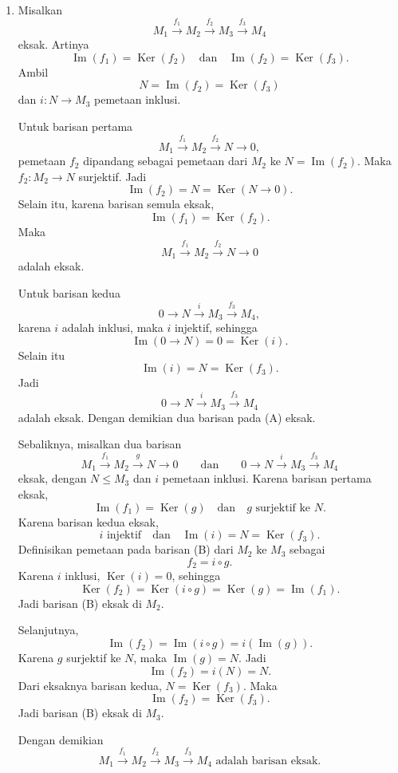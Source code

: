 \documentclass[11pt,letterpaper]{article}
\newcommand{\Ker}{\operatorname{Ker}}
\newcommand{\Img}{\operatorname{Im}}
\begin{document}
\begin{enumerate}
        Dengan demikian
        \[
          \boxed{M=M_t \oplus N}
        \]
        dengan $N$ submodul bebas dari $M$.

  \item Misalkan
        \[
          M_1 \xrightarrow{f_1} M_2 \xrightarrow{f_2} M_3 \xrightarrow{f_3} M_4
        \]
        eksak. Artinya
        \[
          \Img(f_1)=\Ker(f_2)
          \quad \text{dan} \quad
          \Img(f_2)=\Ker(f_3).
        \]
        Ambil
        \[
          N=\Img(f_2)=\Ker(f_3)
        \]
        dan $i:N \to M_3$ pemetaan inklusi.

        Untuk barisan pertama
        \[
          M_1 \xrightarrow{f_1} M_2 \xrightarrow{f_2} N \to 0,
        \]
        pemetaan $f_2$ dipandang sebagai pemetaan dari $M_2$ ke $N=\Img(f_2)$. Maka $f_2:M_2 \to N$ surjektif. Jadi
        \[
          \Img(f_2)=N=\Ker(N \to 0).
        \]
        Selain itu, karena barisan semula eksak,
        \[
          \Img(f_1)=\Ker(f_2).
        \]
        Maka
        \[
          M_1 \xrightarrow{f_1} M_2 \xrightarrow{f_2} N \to 0
        \]
        adalah eksak.

        Untuk barisan kedua
        \[
          0 \to N \xrightarrow{i} M_3 \xrightarrow{f_3} M_4,
        \]
        karena $i$ adalah inklusi, maka $i$ injektif, sehingga
        \[
          \Img(0 \to N)=0=\Ker(i).
        \]
        Selain itu
        \[
          \Img(i)=N=\Ker(f_3).
        \]
        Jadi
        \[
          0 \to N \xrightarrow{i} M_3 \xrightarrow{f_3} M_4
        \]
        adalah eksak. Dengan demikian dua barisan pada (A) eksak.

        Sebaliknya, misalkan dua barisan
        \[
          M_1 \xrightarrow{f_1} M_2 \xrightarrow{g} N \to 0
          \qquad \text{dan} \qquad
          0 \to N \xrightarrow{i} M_3 \xrightarrow{f_3} M_4
        \]
        eksak, dengan $N \leq M_3$ dan $i$ pemetaan inklusi. Karena barisan pertama eksak,
        \[
          \Img(f_1)=\Ker(g)
          \quad \text{dan} \quad
          g \text{ surjektif ke } N.
        \]
        Karena barisan kedua eksak,
        \[
          i \text{ injektif}
          \quad \text{dan} \quad
          \Img(i)=N=\Ker(f_3).
        \]
        Definisikan pemetaan pada barisan (B) dari $M_2$ ke $M_3$ sebagai
        \[
          f_2=i \circ g.
        \]
        Karena $i$ inklusi, $\Ker(i)=0$, sehingga
        \[
          \Ker(f_2)
          =\Ker(i \circ g)
          =\Ker(g)
          =\Img(f_1).
        \]
        Jadi barisan (B) eksak di $M_2$.

        Selanjutnya,
        \[
          \Img(f_2)
          =\Img(i \circ g)
          =i(\Img(g)).
        \]
        Karena $g$ surjektif ke $N$, maka $\Img(g)=N$. Jadi
        \[
          \Img(f_2)=i(N)=N.
        \]
        Dari eksaknya barisan kedua, $N=\Ker(f_3)$. Maka
        \[
          \Img(f_2)=\Ker(f_3).
        \]
        Jadi barisan (B) eksak di $M_3$.

        Dengan demikian
        \[
          \boxed{
            M_1 \xrightarrow{f_1} M_2 \xrightarrow{f_2} M_3 \xrightarrow{f_3} M_4
            \text{ adalah barisan eksak}.
          }
        \]
\end{enumerate}
\end{document}
